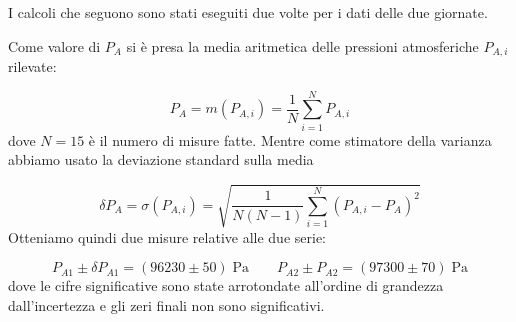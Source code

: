 I calcoli che seguono sono stati eseguiti due volte per i dati delle due giornate.

Come valore di $P_A$ si è presa la media aritmetica delle pressioni atmosferiche $P_{A,i}$ rilevate:

\begin{equation}
    P_A = m(P_{A,i}) = \frac{1}{N}\sum_{i=1}^N P_{A,i}
\end{equation}
%
dove $N = 15$ è il numero di misure fatte. Mentre come stimatore della varianza abbiamo usato la deviazione standard sulla media

\begin{equation}
    \delta P_A = \sigma(P_{A,i}) = \sqrt{\frac{1}{N(N-1)}\sum_{i=1}^N (P_{A,i} - P_A)^2}
\end{equation}
%
Otteniamo quindi due misure relative alle due serie:

\begin{equation}
    P_{A1} \pm \delta P_{A1} = (96230 \pm 50) \; \si{\pascal} \qquad P_{A2} \pm P_{A2} = (97300 \pm 70) \; \si{\pascal}
    \label{eq:pa}
\end{equation}
%
dove le cifre significative sono state arrotondate all'ordine di grandezza dall'incertezza e gli zeri finali non sono significativi.

%
%
%
%

